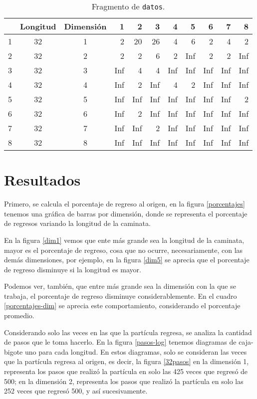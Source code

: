\documentclass[12pt,letterpaper]{article}
\begin{document}
\begin{table}[ht]
\centering
\caption{Fragmento de \texttt{datos}.}
\begin{tabular}{cccrrrrrrrr}
  \hline
 & Longitud & Dimensión & 1 & 2 & 3 & 4 & 5 & 6 & 7 & 8 \\ 
  \hline
1 & 32 & 1 & 2 & 20 & 26 & 4 & 6 & 2 & 4 & 2 \\ 
  2 & 32 & 2 & 2 & 2 & 6 & 2 & Inf & 2 & 2 & Inf \\ 
  3 & 32 & 3 & Inf & 4 & 4 & Inf & Inf & Inf & Inf & Inf \\ 
  4 & 32 & 4 & Inf & 2 & Inf & 4 & 2 & Inf & Inf & Inf \\ 
  5 & 32 & 5 & Inf & Inf & Inf & Inf & Inf & Inf & Inf & 2 \\ 
  6 & 32 & 6 & Inf & 2 & Inf & Inf & Inf & Inf & Inf & Inf \\ 
  7 & 32 & 7 & Inf & Inf & 2 & Inf & Inf & Inf & Inf & Inf \\ 
  8 & 32 & 8 & Inf & Inf & Inf & Inf & Inf & Inf & Inf & Inf \\ 
   \hline
\end{tabular}
\label{datos}
\end{table}

\section{Resultados}
Primero, se calcula el porcentaje de regreso al origen, en la figura \ref{porcentajes} tenemos una gráfica de barras por dimensión, donde se representa el porcentaje de regresos variando la longitud de la caminata. 

En la figura \ref{dim1} vemos que ente más grande sea la longitud de la caminata, mayor es el porcentaje de regreso, cosa que no ocurre, necesariamente, con las demás dimensiones, por ejemplo, en la figura \ref{dim5} se aprecia que el porcentaje de regreso disminuye si la longitud es mayor. 

 Podemos ver, también, que entre más grande sea la dimensión con la que se trabaja, el porcentaje de regreso disminuye considerablemente. En el cuadro \ref{porcentajes-dim} se aprecia este comportamiento, considerando el porcentaje promedio. 
 
Considerando solo las veces en las que la partícula regresa, se analiza la cantidad de pasos que le toma hacerlo. En la figura \ref{pasos-log} tenemos diagramas de caja-bigote uno para cada longitud. En estos diagramas, solo se consideran las veces que la partícula regresa al origen, es decir, la figura \ref{32pasos} en la dimensión 1, representa los pasos que realizó la partícula en solo las 425 veces que regresó de 500; en la dimensión 2, representa los pasos que realizó la partícula en solo las 252 veces que regresó 500, y así sucesivamente. 
\end{document}
